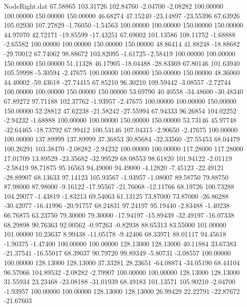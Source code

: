 \begin{filecontents}{NodeRight.dat}
  67.58865  103.31726  102.84760    -2.04700   -2.08282  100.00000  100.00000  150.00000  150.00000   46.68274   47.15240  -23.14897  -23.55396
  67.63926  105.02930  107.27829    -1.76050   -1.54563  100.00000  100.00000  150.00000  150.00000   44.97070   42.72171  -19.85599  -17.43251
  67.69002  101.13586  108.11752    -1.68888   -2.65582  100.00000  100.00000  150.00000  150.00000   48.86414   41.88248  -18.88682  -29.70012
  67.74062   98.88672  103.82095    -1.61725   -2.58419  100.00000  100.00000  150.00000  150.00000   51.11328   46.17905  -18.04488  -28.83369
  67.80146  101.63940  105.59998    -5.30594   -2.47675  100.00000  100.00000  150.00000  150.00000   48.36060   44.40002  -59.43618  -27.74415
  67.85210   96.30210  109.59442    -3.08557   -2.72744  100.00000  100.00000  150.00000  150.00000   53.69790   40.40558  -34.48600  -30.48340
  67.89272   97.71188  102.37762    -1.93957   -2.47675  100.00000  100.00000  150.00000  150.00000   52.28812   47.62238  -21.58242  -27.55994
  67.94333   96.26854  104.02252    -2.94232   -1.68888  100.00000  100.00000  150.00000  150.00000   53.73146   45.97748  -32.64465  -18.73792
  67.99412  100.53146  107.04315    -2.90650   -2.47675  100.00000  100.00000  137.89999  137.89999   37.36853   30.85684  -32.33560  -27.55453
  68.04479  100.26291  103.38470    -2.08282   -2.94232  100.00000  100.00000  117.28000  117.28000   17.01709   13.89529  -23.35682  -32.99529
  68.08553   98.61820  101.94122    -2.01119   -2.58419   98.71875   95.16563   94.49000   94.49000   -4.12820   -7.45123  -22.49121  -28.89907
  68.13633   97.14123  105.93567    -1.93957   -1.08007   89.58750   79.88750   87.98000   87.98000   -9.16122  -17.95567  -21.76068  -12.11766
  68.19726  100.73288  104.29077    -1.43819   -1.83213   69.54063   61.13125   73.87000   73.87000  -26.86288  -30.42077  -16.41996  -20.91757
  68.24831   97.24197   95.19440    -2.83488   -1.40238   66.76875   63.23750   79.30000   79.30000  -17.94197  -15.89439  -32.49197  -16.07338
  68.29898   90.76363   92.00562    -0.97263   -0.82938   88.65313   83.55000  101.00000  101.00000   10.23637    8.99438  -11.05178   -9.42406
  68.33971   88.01117   94.45618    -1.90375   -1.47400  100.00000  100.00000  128.13000  128.13000   40.11884   33.67383  -21.37541  -16.55017
  68.39037   90.79720   99.89349    -5.80731   -3.08557  100.00000  100.00000  128.13000  128.13000   37.33281   28.23651  -64.08874  -34.05190
  68.44104   96.57066  104.89532    -2.08282   -2.79907  100.00000  100.00000  128.13000  128.13000   31.55934   23.23468  -23.08188  -31.01939
  68.49183  101.13571  105.90210    -2.04700   -1.93957  100.00000  100.00000  128.13000  128.13000   26.99429   22.22791  -22.87672  -21.67603

\end{filecontents}
